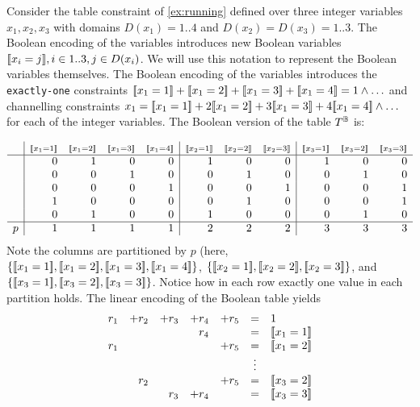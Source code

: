 \documentclass[a4paper,UKenglish,cleveref,autoref,thm-restate]{lipics-v2021}
\begin{document}
\begin{example}
\label{ex:binary}
\label{ex:table}
Consider the table constraint of \cref{ex:running}
defined over three integer variables $x_1, x_2, x_3$ with domains 
$D(x_1) = 1..4$ and $D(x_2)= D(x_3) = 1..3$.
The Boolean encoding of the variables introduces new Boolean variables $[\![x_i = j]\!], i \in 1..3, j \in D(x_i)$.
We will use this notation to represent the Boolean variables themselves.
The Boolean encoding of the variables introduces the \texttt{exactly-one} constraints 
$\be{1}{1} + \be{1}{2} + \be{1}{3} + \be{1}{4} = 1 \land \ldots$
and channelling constraints $x_1 = \be{1}{1} + 2 \be{1}{2} + 3 \be{1}{3} + 4\be{1}{4} \land \ldots$
for each of the integer variables.
The Boolean version of the table $T^{\mathbb{B}}{}$  is:

   \begin{equation*}
   \begin{array}{l|rrrr|rrr|rrr}
&  {\besml{1}{1}} & \besml{1}{2} & \besml{1}{3} & \besml{1}{4} & \besml{2}{1} & \besml{2}{2} & \besml{2}{3} & \besml{3}{1} & \besml{3}{2} & \besml{3}{3} \\ \hline
&   0   & 1   & 0   & 0   & 1   & 0   & 0   & 1   & 0   & 0 \\
&   0   & 0   & 1   & 0   & 0   & 1   & 0   & 0   & 1   & 0 \\
&   0   & 0   & 0   & 1   & 0   & 0   & 1   & 0   & 0   & 1 \\
&   1   & 0   & 0   & 0   & 0   & 1   & 0   & 0   & 0   & 1 \\
&   0   & 1   & 0   & 0   & 1   & 0   & 0   & 0   & 1   & 0 \\ \hline
p& 1   & 1   & 1   & 1   & 2   & 2   & 2   & 3   & 3   & 3    \\
   \end{array}
   \end{equation*}
   Note the columns are partitioned by $p$ (here, $\{\be{1}{1}, \be{1}{2}, \be{1}{3}, \be{1}{4}\}$, $\{[\![x_{2} = 1]\!], [\![x_{2} = 2]\!], [\![x_{2} = 3]\!]\}$, and $\{[\![x_{3} = 1]\!],[\![x_{3} = 2]\!],[\![x_{3} = 3]\!]\}$.
Notice how in each row exactly one value in each partition holds.   
The linear encoding of the Boolean table yields
\begin{equation*}
\begin{array}{rrrrrcl}
r_1 &+ r_2& + r_3& + r_4& + r_5 &= &1 \\
&&&r_4 && = & \be{1}{1} \\
r_1 &&&& +r_5 & = &\be{1}{2} \\
&&&&& \vdots & \\
& r_2 &&& +r_5 & = & \be{3}{2} \\
&& r_3 & + r_4 && = & \be{3}{3}
\end{array}
\end{equation*}
\end{example}
\end{document}
